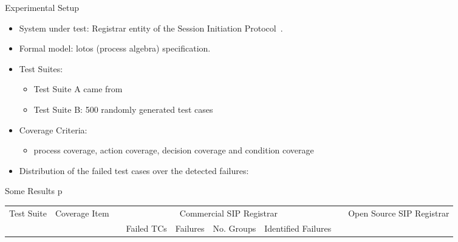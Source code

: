 \documentclass[final,hyperref={pdfpagelabels=false}]{beamer}
\begin{document}
\begin{frame}
  \begin{minipage}{0.395\textwidth}
    \begin{block}{Experimental Setup}
      \begin{itemize}
      \item System under test: Registrar entity of the Session
        Initiation Protocol~\cite{rfc3261sip}. 
      \item Formal model: {\sc lotos} (process algebra)
        specification. 
      \item Test Suites:
        \begin{itemize}
          \item Test Suite A came from \cite{aichernig2007protocol}
          \item Test Suite B: 500 randomly generated test cases
          \end{itemize}
      \item Coverage Criteria:
        \begin{itemize}
          \item process coverage, action coverage, decision coverage
              and condition coverage
         \end{itemize}
      \item Distribution of the failed test cases over the detected failures:
      \begin{center}
      \end{center}
      \end{itemize}
    \end{block}
\end{minipage}
\quad
\begin{minipage}{0.585\textwidth}
\newcommand{\mysp}{{\color{block body.bg}0}}
    \begin{block}{Some Results {\color{block title.bg}p}}
\begin{center}
  \begin{tabular}{ccp{10mm}ccccp{12mm}cccc}
  \toprule
   \multicolumn{1}{c}{\multirow{3}{25mm}{\centering Test Suite}} & 
   \multicolumn{1}{c}{\multirow{3}{45mm}{\centering Coverage Item}} && 
   \multicolumn{4}{c}{Commercial SIP Registrar} &&
   \multicolumn{4}{c}{Open Source SIP Registrar} \\
   \cmidrule{4-7} \cmidrule{9-12}
   &&& 
      \multirow{2}{42mm}{\centering Failed TCs} & 
      \multirow{2}{33mm}{\centering Fail\-ures} &
      \multirow{2}{40mm}{\centering No. Groups} & 
      \multirow{2}{45mm}{\centering Identified Failures} 

\end{tabular}
\end{center}
\end{block}
\end{minipage}
\end{frame}
\end{document}
